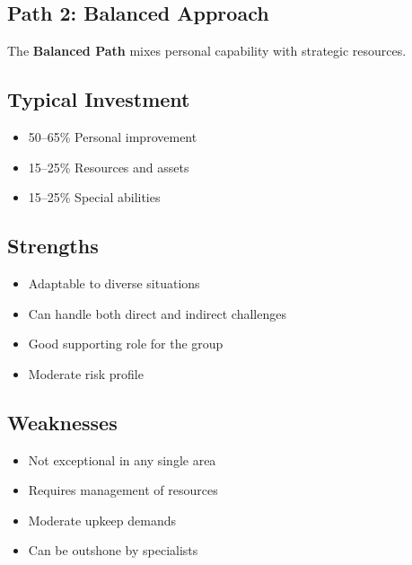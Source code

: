 \begin{multicols}{2}
\section{Path 2: Balanced Approach}

The \textbf{Balanced Path} mixes personal capability with strategic resources.

\subsection*{Typical Investment}
\begin{itemize}
\item 50--65\% Personal improvement
\item 15--25\% Resources and assets
\item 15--25\% Special abilities
\end{itemize}

\subsection*{Strengths}
\begin{itemize}
\item Adaptable to diverse situations
\item Can handle both direct and indirect challenges
\item Good supporting role for the group
\item Moderate risk profile
\end{itemize}

\subsection*{Weaknesses}
\begin{itemize}
\item Not exceptional in any single area
\item Requires management of resources
\item Moderate upkeep demands
\item Can be outshone by specialists
\end{itemize}


\end{multicols}
